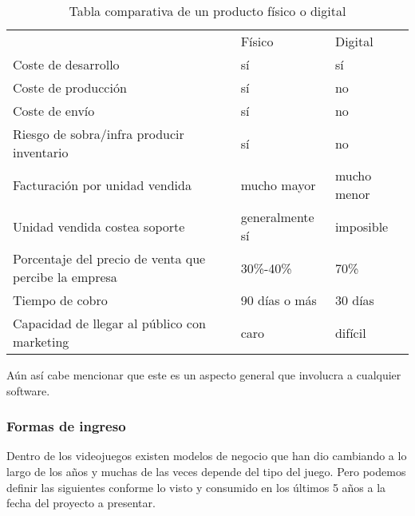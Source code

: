 \begin{table}[htbp]
	\centering
	\caption{Tabla comparativa de un producto físico o digital}
	\label{fiDi}
	\begin{tabular}{lll}
		& Físico          & Digital     \\
		Coste de desarrollo                                   & sí              & sí          \\
		Coste de producción                                   & sí              & no          \\
		Coste de envío                                        & sí              & no          \\
		Riesgo de sobra/infra producir inventario             & sí              & no          \\
		Facturación por unidad vendida                        & mucho mayor     & mucho menor \\
		Unidad vendida costea soporte                         & generalmente sí & imposible   \\
		Porcentaje del precio de venta que percibe la empresa & 30\%-40\%       & 70\%        \\
		Tiempo de cobro                                       & 90 días o más   & 30 días     \\
		Capacidad de llegar al público con marketing          & caro            & difícil
	\end{tabular}
\end{table}

Aún así cabe mencionar que este es un aspecto general que involucra a cualquier software.

\subsubsection{Formas de ingreso}
Dentro de los videojuegos existen modelos de negocio que han dio cambiando a lo largo de los años y muchas de las veces depende del tipo del juego. Pero podemos definir las siguientes conforme lo visto y consumido en los últimos 5 años a la fecha del proyecto a presentar.

